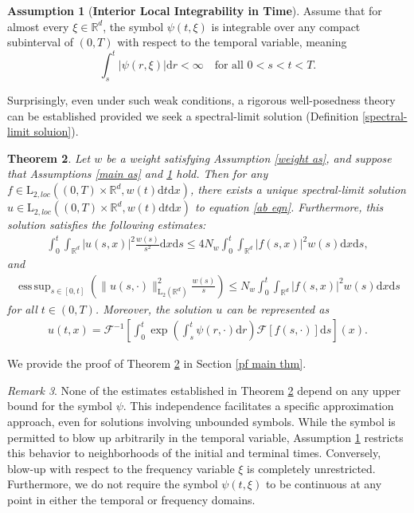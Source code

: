 \documentclass[11pt,reqno]{amsart}
\newtheorem{thm}{Theorem}[section]
\theoremstyle{definition}
\newtheorem{assumption}[thm]{Assumption}
\theoremstyle{remark}
\newtheorem{rem}[thm]{Remark}
\newcommand\bR{\mathbb{R}}
\newcommand\cF{\mathcal{F}}
\DeclareMathOperator*{\esssup}{ess\,sup}
\numberwithin{equation}{section}
\begin{document}
\begin{assumption}[\bf Interior Local Integrability in Time]
										\label{main as 2}
Assume that for almost every $\xi \in \bR^d$, the symbol $\psi(t,\xi)$ is integrable over any compact subinterval of $(0,T)$ with respect to the temporal variable, meaning
$$
\int_s^t|\psi(r,\xi)| \mathrm{d}r < \infty \quad \text{for all } 0<s<t<T.
$$
\end{assumption}



Surprisingly, even under such weak conditions, a rigorous well-posedness theory can be established provided we seek a spectral-limit solution (Definition \ref{spectral-limit soluion}).

\begin{thm}
							\label{main thm}
Let $w$ be a weight satisfying Assumption \ref{weight as}, and suppose that Assumptions \ref{main as} and \ref{main as 2} hold. 
Then for any $f \in \mathrm{L}_{2,loc}\left( (0,T) \times \bR^d, w(t)\mathrm{d}t\mathrm{d}x \right)$, there exists a unique spectral-limit solution $u \in \mathrm{L}_{2,loc}\left( (0,T) \times \bR^d, w(t)\mathrm{d}t\mathrm{d}x \right)$ to equation \eqref{ab eqn}. Furthermore, this solution satisfies the following estimates:
\begin{align}
									\label{a priori est 2-2}
\int_0^t \int_{\bR^d} \left|u(s,x)\right|^2 \frac{w(s)}{s^2}\mathrm{d}x\mathrm{d}s
\leq 4N_w\int_0^t\int_{\bR^d}|f(s,x)|^2 w(s)\mathrm{d}x\mathrm{d}s,
\end{align}
and
\begin{align}
									\label{a priori est 2-3}
\esssup_{s \in [0,t]} \left( \|u(s,\cdot)\|^2_{\mathrm{L}_2(\bR^d)} \frac{w(s)}{s} \right)
\leq  N_w\int_0^{t} \int_{\bR^d} |f(s,x)|^2  w(s)  \mathrm{d}x\mathrm{d}s
\end{align}
for all $t \in (0,T)$.
Moreover, the solution $u$ can be represented as
\begin{align}
									\label{unique solution}
u(t,x)=  \cF^{-1}\left[ \int_0^t  \exp\left(\int_s^t\psi(r,\cdot)\mathrm{d}r \right) \cF[f(s,\cdot)]\mathrm{d}s \right](x).
\end{align}
\end{thm}


We provide the proof of Theorem \ref{main thm} in Section \ref{pf main thm}.

\begin{rem}
None of the estimates established in Theorem \ref{main thm} depend on any upper bound for the symbol $\psi$. 
This independence facilitates a specific approximation approach, even for solutions involving unbounded symbols. 
While the symbol is permitted to blow up arbitrarily in the temporal variable, Assumption \ref{main as 2} restricts this behavior to neighborhoods of the initial and terminal times. 
Conversely, blow-up with respect to the frequency variable $\xi$ is completely unrestricted. 
Furthermore, we do not require the symbol $\psi(t,\xi)$ to be continuous at any point in either the temporal or frequency domains.
\end{rem}
\end{document}
